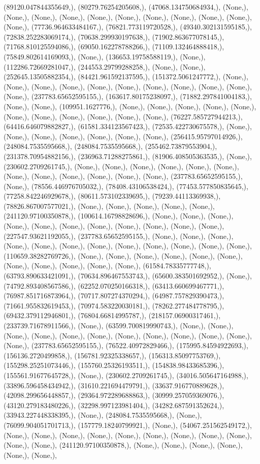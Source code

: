 \documentclass{article}
\begin{document}
(89120.047844355649,), (80279.76254205608,), (47068.134750684934,), (None,), (None,), (None,), (None,), (None,), (None,), (None,), (None,), (None,), (None,), (None,), (77736.964633484167,), (76821.773119720528,), (49340.302131595185,), (72838.252283069174,), (70638.299930197638,), (71902.863677078145,), (71768.810125594086,), (69050.162278788266,), (71109.132464888418,), (75849.802614169093,), (None,), (136653.19758588119,), (None,), (112286.72669281047,), (244553.29799288258,), (None,), (None,), (252645.13505882354,), (84421.961592137595,), (151372.5061247772,), (None,), (None,), (None,), (None,), (None,), (None,), (None,), (None,), (None,), (None,), (None,), (237783.65652595155,), (163617.80175238097,), (71882.297841004183,), (None,), (None,), (109951.1627776,), (None,), (None,), (None,), (None,), (None,), (None,), (None,), (None,), (None,), (None,), (None,), (76227.585727944213,), (64416.646079882827,), (61581.334123567423,), (72535.422730675578,), (None,), (None,), (None,), (None,), (None,), (None,), (None,), (256415.95797014926,), (248084.7535595668,), (248084.7535595668,), (255462.73879553904,), (231378.70954882156,), (236963.71288275861,), (81906.408505363535,), (None,), (230602.2709261745,), (None,), (None,), (None,), (None,), (None,), (None,), (None,), (None,), (None,), (None,), (None,), (None,), (237783.65652595155,), (None,), (78556.446976705032,), (78408.43106538424,), (77453.577850835645,), (77258.842246929678,), (80611.573102339695,), (79239.44113369938,), (78826.867007577021,), (None,), (None,), (None,), (None,), (None,), (241120.97100350878,), (100614.16798828696,), (None,), (None,), (None,), (None,), (None,), (None,), (None,), (None,), (None,), (None,), (None,), (227547.93621192055,), (237783.65652595155,), (None,), (None,), (None,), (None,), (None,), (None,), (None,), (None,), (None,), (None,), (None,), (None,), (110659.38282769726,), (None,), (None,), (None,), (None,), (None,), (None,), (None,), (None,), (None,), (None,), (None,), (61584.78335777748,), (63793.890633421091,), (70634.896467553743,), (65600.383501692952,), (None,), (74792.893408567586,), (62252.070250166318,), (63413.660699467771,), (76987.851716873964,), (70717.807274370294,), (64987.757829390473,), (71661.955832619453,), (70974.583220030181,), (78262.277484778795,), (69432.379112946801,), (76804.66814995787,), (218157.06900317461,), (233739.71678911566,), (None,), (63599.700819990743,), (None,), (None,), (None,), (None,), (None,), (None,), (None,), (None,), (None,), (None,), (None,), (None,), (237783.65652595155,), (76522.40972829466,), (175995.84594922693,), (156136.2720499858,), (156781.92325338657,), (156313.85097753769,), (155298.25251073446,), (155760.25326193511,), (154838.98433685396,), (155561.91677645728,), (None,), (230602.2709261745,), (34016.505647164988,), (33896.596458434942,), (31610.221694479791,), (33637.916770889628,), (42098.299656448857,), (29364.972289688863,), (30999.257059369076,), (43120.279183480226,), (32298.997123981404,), (34282.687591352624,), (33943.227448338395,), (None,), (248084.7535595668,), (None,), (76099.904051701713,), (157779.18240799921,), (None,), (54067.251562549172,), (None,), (None,), (None,), (None,), (None,), (None,), (None,), (None,), (None,), (None,), (None,), (241120.97100350878,), (None,), (None,), (None,), (None,), (None,), (None,), 
\end{document}
